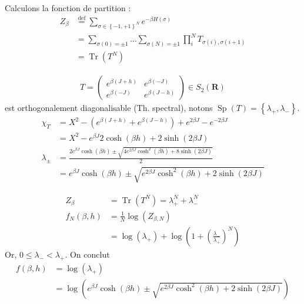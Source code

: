 \documentclass[french]{beamer}
\newcommand\eqdef{\overset{\mathrm{def}}{=}}
\DeclareMathOperator{\Tr}{Tr}
\DeclareMathOperator{\Sp}{Sp}
\begin{document}
\begin{frame}
Calculons la fonction de partition :
\begin{align*}
Z_\beta &\eqdef \sum_{\sigma \in \left\{-1, +1\right\}^N} e^{-\beta H(\sigma)} \\
&=\sum_{\sigma(0) = \pm 1} \dots \sum_{\sigma(N) = \pm 1} \prod_{i}^{N} T_{\sigma(i), \sigma(i+1)} \\
&= \Tr\left(T^N\right)
\end{align*}
\end{frame}

\begin{frame}
    
    \begin{align*}
    T =
   \begin{pmatrix}
	e^{\beta(J + h)}  &   e^{\beta(- J)} \\
	e^{\beta(-J)} & e^{\beta(J - h)}
	\end{pmatrix}
    \in S_2\left(\mathbf{R}\right)
    \end{align*}
    est orthogonalement diagonalisable (Th. spectral), notons \(\Sp\left(T\right) = \left\{\lambda_+, \lambda_-\right\}\).
    \begin{align*}
 		\chi_T &= X^2 - \left(e^{\beta(J + h)} + e^{\beta(J - h)}\right) + e^{2\beta J} - e^{-2\beta J} \\
 		               & = X^2 - e^{\beta J}  2\cosh(\beta h) + 2\sinh(2\beta J)\\
 		\lambda_\pm &= \frac{2e^{\beta J}\cosh(\beta h) \pm \sqrt{4e^{2\beta J}\cosh^2(\beta h) + 8\sinh(2\beta J)}}{2} \\
 		                              &= e^{\beta J}\cosh(\beta h) \pm \sqrt{e^{2\beta J}\cosh^2(\beta h) + 2\sinh(2\beta J)}
    \end{align*}

\end{frame}


\begin{frame}
\begin{align*}
Z_\beta &= \Tr\left(T^N\right) = \lambda_+^N + \lambda_-^N\\
f_N(\beta,h) &= \frac{1}{N} \log\left(Z_{\beta,N}\right) \\
&=  \log\left(\lambda_+\right)  + \log\left(1 + \left(\frac{\lambda_-}{\lambda_+}\right)^N \right)
\end{align*}
Or, $0 \leq \lambda_- < \lambda_+$. On conclut
\begin{align*}
	f(\beta, h) &= \log\left(\lambda_+\right) \\
							&= \log\left( e^{\beta J}\cosh(\beta h) \pm \sqrt{e^{2\beta J}\cosh^2(\beta h) + 2\sinh(2\beta J)} \right)
\end{align*}
\end{frame}
\end{document}
